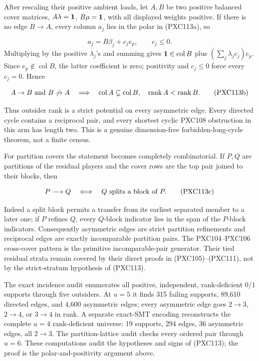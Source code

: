 \documentclass[11pt]{article}
\begin{document}
After rescaling their positive ambient loads, let \(A,B\) be two positive
balanced cover matrices,
\(A\lambda={\bf1}\), \(B\mu={\bf1}\), with all displayed weights positive.
If there is no edge \(B\to A\), every column \(a_j\) lies in the polar in
(PXC113a), so

\[
 a_j=B\beta_j+c_je_p,\qquad c_j\le0.
\]
Multiplying by the positive \(\lambda_j\)'s and summing gives
\({\bf1}\in\operatorname{col}B\) plus
\((\sum_j\lambda_jc_j)e_p\).  Since
\(e_p\notin\operatorname{col}B\), the latter coefficient is zero; positivity
and \(c_j\le0\) force every \(c_j=0\).  Hence

\begin{equation}
 A\to B\ \hbox{and}\ B\not\to A
 \quad\Longrightarrow\quad
 \operatorname{col}A\subsetneq\operatorname{col}B,
 \quad \operatorname{rank}A<\operatorname{rank}B.          \tag{PXC113b}
\end{equation}

Thus outsider rank is a strict potential on every asymmetric edge.  Every
directed cycle contains a reciprocal pair, and every shortest cyclic
PXC108 obstruction in this arm has length two.  This is a genuine
dimension-free forbidden-long-cycle theorem, not a finite census.

For partition covers the statement becomes completely combinatorial.  If
\(P,Q\) are partitions of the residual players and the cover rows are the
top pair joined to their blocks, then

\begin{equation}
 P\longrightarrow Q
 \quad\Longleftrightarrow\quad
 Q\hbox{ splits a block of }P.                              \tag{PXC113c}
\end{equation}

Indeed a split block permits a transfer from its earliest separated member
to a later one; if \(P\) refines \(Q\), every \(Q\)-block indicator lies in
the span of the \(P\)-block indicators.  Consequently asymmetric edges are
strict partition refinements and reciprocal edges are exactly incomparable
partition pairs.  The PXC104--PXC106 cross-cover pattern is the primitive
incomparable-pair generator.  Their tied residual strata remain covered by
their direct proofs in (PXC105)--(PXC111), not by the strict-stratum
hypothesis of (PXC113).

The exact incidence audit enumerates all positive, independent,
rank-deficient \(0/1\) supports through five outsiders.  At \(u=5\) it
finds 315 failing supports, 89{,}610 directed edges, and 4{,}600 asymmetric
edges; every asymmetric edge goes \(2\to3\), \(2\to4\), or \(3\to4\) in
rank.  A separate exact-SMT encoding reconstructs the complete \(u=4\)
rank-deficient universe: 19 supports, 294 edges, 36 asymmetric edges, all
\(2\to3\).  The partition-lattice audit checks every ordered pair through
\(u=6\).
These computations audit the hypotheses and signs of (PXC113); the proof is
the polar-and-positivity argument above.
\end{document}
